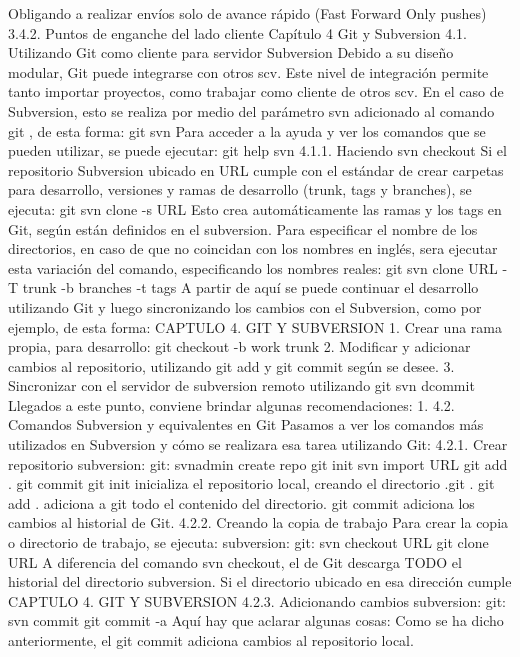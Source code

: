 \documentclass[12pt, spanish, oneside, onecolumn, a4paper]{report}
\begin{document}
Obligando a realizar envíos solo de avance rápido (Fast Forward Only pushes)
3.4.2. Puntos de enganche del lado cliente
 Capítulo 4
Git y Subversion
4.1. Utilizando Git como cliente para servidor Subversion
Debido a su diseño modular, Git puede integrarse con otros \gls{scv}. Este nivel de integración permite tanto importar proyectos, como trabajar como cliente de otros \gls{scv}. En el caso de Subversion, esto se realiza por medio del parámetro svn adicionado al comando git , de esta forma:
 git svn
Para acceder a la ayuda y ver los comandos que se pueden utilizar, se puede ejecutar:
 git help svn
4.1.1. Haciendo svn checkout
Si el repositorio Subversion ubicado en URL cumple con el estándar de crear carpetas para desarrollo, versiones y ramas de desarrollo (trunk, tags y branches), se ejecuta:
 git svn clone -s URL
Esto crea automáticamente las ramas y los tags en Git, según están definidos en el subversion. Para especificar el nombre de los directorios, en caso de que no coincidan con los nombres en inglés, sera ejecutar esta variación del comando, especificando los nombres reales:
 git svn clone URL -T trunk -b branches -t tags
A partir de aquí se puede continuar el desarrollo utilizando Git y luego sincronizando los cambios con el Subversion, como por ejemplo, de esta forma:
 CAPTULO 4. GIT Y SUBVERSION 1. Crear una rama propia, para desarrollo:
 git checkout -b work trunk
2. Modificar y adicionar cambios al repositorio, utilizando git add y git commit según se desee.
3. Sincronizar con el servidor de subversion remoto utilizando
 git svn dcommit
Llegados a este punto, conviene brindar algunas recomendaciones:
1.
4.2. Comandos Subversion y equivalentes en Git
Pasamos a ver los comandos más utilizados en Subversion y cómo se realizara esa tarea utilizando Git:
4.2.1. Crear repositorio
subversion: git:  svnadmin create repo  git init  svn import URL  git add .  git commit git init inicializa el repositorio local, creando el directorio .git .
git add . adiciona a git todo el contenido del directorio.
git commit adiciona los cambios al historial de Git.
4.2.2. Creando la copia de trabajo
Para crear la copia o directorio de trabajo, se ejecuta: subversion: git:  svn checkout URL  git clone URL A diferencia del comando svn checkout, el de Git descarga TODO el historial del directorio subversion. Si el directorio ubicado en esa dirección cumple
 CAPTULO 4. GIT Y SUBVERSION 4.2.3. Adicionando cambios
subversion: git:  svn commit  git commit -a Aquí hay que aclarar algunas cosas:
Como se ha dicho anteriormente, el git commit adiciona cambios al repositorio local.
\end{document}

